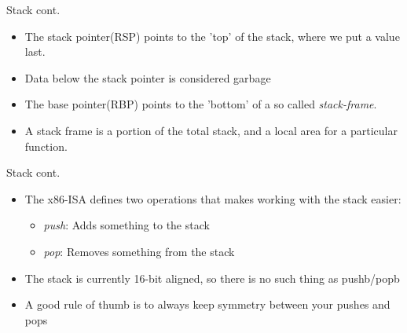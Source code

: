 \documentclass[
	11pt, %
	aspectratio=169, %
]{beamer}
\begin{document}
\begin{frame}{Stack cont.}{\sectiontitle}
    \begin{itemize}
        \item The stack pointer(RSP) points to the 'top' of the stack, where we put a value last.
        \item Data below the stack pointer is considered garbage
        \item The base pointer(RBP) points to the 'bottom' of a so called \textit{stack-frame}.
        \item A stack frame is a portion of the total stack, and a local area for a particular function.
    \end{itemize}
\end{frame}

\begin{frame}{Stack cont.}{\sectiontitle}
    \begin{itemize}
        \item The x86-ISA defines two operations that makes working with the stack easier:
              \begin{itemize}
                  \item \textit{push}: Adds something to the stack
                  \item \textit{pop}: Removes something from the stack
              \end{itemize}
        \item The stack is currently 16-bit aligned, so there is no such thing as pushb/popb
        \item A good rule of thumb is to always keep symmetry between your pushes and pops
    \end{itemize}
\end{frame}
\end{document}
